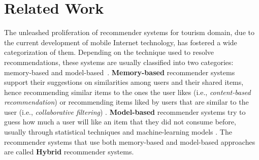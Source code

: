 \section{Related Work} \label{section:related-work}




The unleashed proliferation  of recommender systems for tourism domain, due to the current development of mobile Internet technology, has fostered a wide categorization of them. 
Depending on the technique used to resolve recommendations, these systems are usually classified into two categories: memory-based and model-based~\cite{bobadilla2013recommender,sun2019building}. \textbf{Memory-based} recommender systems support their  suggestions on similarities among users and their shared items, hence recommending similar items to the ones the user likes (i.e., \textit{content-based recommendation}) or recommending items liked by users that are similar to the user (i.e., \textit{collaborative filtering}) \cite{ebrahim_2012}. \textbf{Model-based} recommender systems try to guess how much a user will like an item that they did not consume before, usually through statistical techniques and machine-learning models \cite{ebrahim_2012}. The recommender systems that use both memory-based and model-based approaches are called \textbf{Hybrid} recommender systems.

